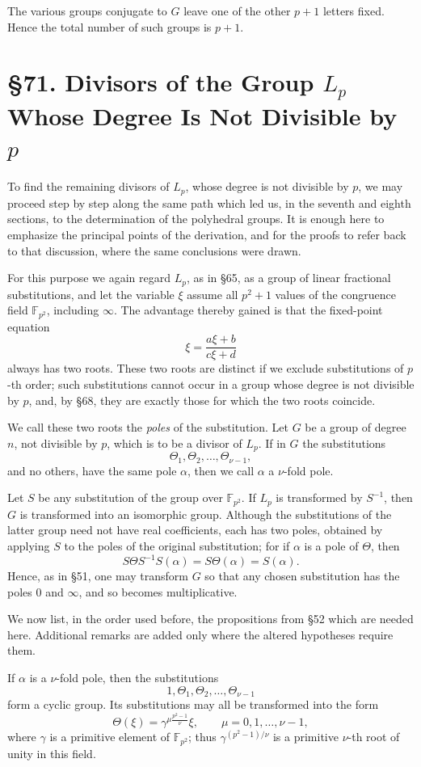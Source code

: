 \documentclass[11pt,a4paper]{book}
\newcommand{\webersection}[2]{\clearpage\section*{\S #1. #2}}
\newcommand{\F}{\mathbb F}
\begin{document}
The various groups conjugate to \(G\) leave one of the other \(p+1\) letters fixed.  Hence the total number of such groups is \(p+1\).

\webersection{71}{Divisors of the Group \(L_p\) Whose Degree Is Not Divisible by \(p\)}

To find the remaining divisors of \(L_p\), whose degree is not divisible by \(p\), we may proceed step by step along the same path which led us, in the seventh and eighth sections, to the determination of the polyhedral groups.  It is enough here to emphasize the principal points of the derivation, and for the proofs to refer back to that discussion, where the same conclusions were drawn.

For this purpose we again regard \(L_p\), as in \S 65, as a group of linear fractional substitutions, and let the variable \(\xi\) assume all \(p^2+1\) values of the congruence field \(\F_{p^2}\), including \(\infty\).  The advantage thereby gained is that the fixed-point equation
\[
 \xi=\frac{a\xi+b}{c\xi+d}
\]
always has two roots.  These two roots are distinct if we exclude substitutions of \(p\)-th order; such substitutions cannot occur in a group whose degree is not divisible by \(p\), and, by \S 68, they are exactly those for which the two roots coincide.

We call these two roots the \emph{poles} of the substitution.  Let \(G\) be a group of degree \(n\), not divisible by \(p\), which is to be a divisor of \(L_p\).  If in \(G\) the substitutions
\[
 \Theta_1,\Theta_2,\ldots,\Theta_{\nu-1},
\]
and no others, have the same pole \(\alpha\), then we call \(\alpha\) a \(\nu\)-fold pole.

Let \(S\) be any substitution of the group over \(\F_{p^2}\).  If \(L_p\) is transformed by \(S^{-1}\), then \(G\) is transformed into an isomorphic group.  Although the substitutions of the latter group need not have real coefficients, each has two poles, obtained by applying \(S\) to the poles of the original substitution; for if \(\alpha\) is a pole of \(\Theta\), then
\[
 S\Theta S^{-1}S(\alpha)=S\Theta(\alpha)=S(\alpha).
\]
Hence, as in \S 51, one may transform \(G\) so that any chosen substitution has the poles \(0\) and \(\infty\), and so becomes multiplicative.

We now list, in the order used before, the propositions from \S 52 which are needed here.  Additional remarks are added only where the altered hypotheses require them.

If \(\alpha\) is a \(\nu\)-fold pole, then the substitutions
\[
 1,\Theta_1,\Theta_2,\ldots,\Theta_{\nu-1}
\]
form a cyclic group.  Its substitutions may all be transformed into the form
\[
 \Theta(\xi)=\gamma^{\mu\frac{p^2-1}{\nu}}\xi,\qquad
 \mu=0,1,\ldots,\nu-1,
\]
where \(\gamma\) is a primitive element of \(\F_{p^2}\); thus
\(\gamma^{(p^2-1)/\nu}\) is a primitive \(\nu\)-th root of unity in this field.
\end{document}
